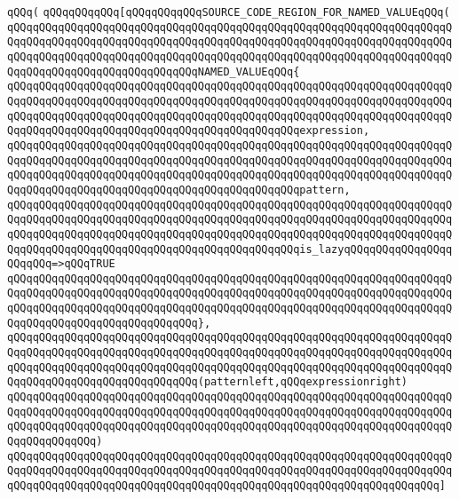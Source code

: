 \verb|qQQq(|\newline
\verb|qQQqqQQqqQQq[qQQqqQQqqQQqSOURCE_CODE_REGION_FOR_NAMED_VALUEqQQq(|\newline
\verb|qQQqqQQqqQQqqQQqqQQqqQQqqQQqqQQqqQQqqQQqqQQqqQQqqQQqqQQqqQQqqQQqqQQqqQQqqQQqqQQqqQQqqQQqqQQqqQQqqQQqqQQqqQQqqQQqqQQqqQQqqQQqqQQqqQQqqQQqqQQqqQQqqQQqqQQqqQQqqQQqqQQqqQQqqQQqqQQqqQQqqQQqqQQqqQQqqQQqqQQqqQQqqQQqqQQqqQQqqQQqqQQqqQQqqQQqqQQqqQQqNAMED_VALUEqQQq{|\newline
\verb|qQQqqQQqqQQqqQQqqQQqqQQqqQQqqQQqqQQqqQQqqQQqqQQqqQQqqQQqqQQqqQQqqQQqqQQqqQQqqQQqqQQqqQQqqQQqqQQqqQQqqQQqqQQqqQQqqQQqqQQqqQQqqQQqqQQqqQQqqQQqqQQqqQQqqQQqqQQqqQQqqQQqqQQqqQQqqQQqqQQqqQQqqQQqqQQqqQQqqQQqqQQqqQQqqQQqqQQqqQQqqQQqqQQqqQQqqQQqqQQqqQQqqQQqqQQqqQQqexpression,|\newline
\verb|qQQqqQQqqQQqqQQqqQQqqQQqqQQqqQQqqQQqqQQqqQQqqQQqqQQqqQQqqQQqqQQqqQQqqQQqqQQqqQQqqQQqqQQqqQQqqQQqqQQqqQQqqQQqqQQqqQQqqQQqqQQqqQQqqQQqqQQqqQQqqQQqqQQqqQQqqQQqqQQqqQQqqQQqqQQqqQQqqQQqqQQqqQQqqQQqqQQqqQQqqQQqqQQqqQQqqQQqqQQqqQQqqQQqqQQqqQQqqQQqqQQqqQQqqQQqqQQqpattern,|\newline
\verb|qQQqqQQqqQQqqQQqqQQqqQQqqQQqqQQqqQQqqQQqqQQqqQQqqQQqqQQqqQQqqQQqqQQqqQQqqQQqqQQqqQQqqQQqqQQqqQQqqQQqqQQqqQQqqQQqqQQqqQQqqQQqqQQqqQQqqQQqqQQqqQQqqQQqqQQqqQQqqQQqqQQqqQQqqQQqqQQqqQQqqQQqqQQqqQQqqQQqqQQqqQQqqQQqqQQqqQQqqQQqqQQqqQQqqQQqqQQqqQQqqQQqqQQqqQQqqQQqis_lazyqQQqqQQqqQQqqQQqqQQqqQQq=>qQQqTRUE|\newline
\verb|qQQqqQQqqQQqqQQqqQQqqQQqqQQqqQQqqQQqqQQqqQQqqQQqqQQqqQQqqQQqqQQqqQQqqQQqqQQqqQQqqQQqqQQqqQQqqQQqqQQqqQQqqQQqqQQqqQQqqQQqqQQqqQQqqQQqqQQqqQQqqQQqqQQqqQQqqQQqqQQqqQQqqQQqqQQqqQQqqQQqqQQqqQQqqQQqqQQqqQQqqQQqqQQqqQQqqQQqqQQqqQQqqQQqqQQqqQQqqQQq},|\newline
\verb|qQQqqQQqqQQqqQQqqQQqqQQqqQQqqQQqqQQqqQQqqQQqqQQqqQQqqQQqqQQqqQQqqQQqqQQqqQQqqQQqqQQqqQQqqQQqqQQqqQQqqQQqqQQqqQQqqQQqqQQqqQQqqQQqqQQqqQQqqQQqqQQqqQQqqQQqqQQqqQQqqQQqqQQqqQQqqQQqqQQqqQQqqQQqqQQqqQQqqQQqqQQqqQQqqQQqqQQqqQQqqQQqqQQqqQQqqQQqqQQq(patternleft,qQQqexpressionright)|\newline
\verb|qQQqqQQqqQQqqQQqqQQqqQQqqQQqqQQqqQQqqQQqqQQqqQQqqQQqqQQqqQQqqQQqqQQqqQQqqQQqqQQqqQQqqQQqqQQqqQQqqQQqqQQqqQQqqQQqqQQqqQQqqQQqqQQqqQQqqQQqqQQqqQQqqQQqqQQqqQQqqQQqqQQqqQQqqQQqqQQqqQQqqQQqqQQqqQQqqQQqqQQqqQQqqQQqqQQqqQQqqQQqqQQq)|\newline
\verb|qQQqqQQqqQQqqQQqqQQqqQQqqQQqqQQqqQQqqQQqqQQqqQQqqQQqqQQqqQQqqQQqqQQqqQQqqQQqqQQqqQQqqQQqqQQqqQQqqQQqqQQqqQQqqQQqqQQqqQQqqQQqqQQqqQQqqQQqqQQqqQQqqQQqqQQqqQQqqQQqqQQqqQQqqQQqqQQqqQQqqQQqqQQqqQQqqQQqqQQqqQQqqQQq]|\newline
